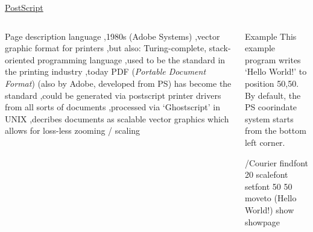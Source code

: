 \begin{frame}[fragile]{\href{https://en.wikipedia.org/wiki/PostScript}{PostScript}} \footnotesize
{}
\begin{columns}
Page description language \sep 1980s (Adobe Systems) \sep vector graphic format for printers \sep but also: Turing-complete, stack-oriented  programming language \sep used to be the standard in the printing industry \sep today PDF (\emph{Portable Document Format}) (also by Adobe, developed from PS) has become the standard \sep could be generated via postscript printer drivers from all sorts of documents \sep processed via  `Ghostscript' in UNIX \sep decribes documents as scalable vector graphics which allows for loss-less zooming / scaling 
~\\[0.2em]

\begin{block}{Example}
This example program writes `Hello World!' to position 50,50. By default, the PS coorindate system starts from the bottom left corner. 
\begin{postscriptcode}
/Courier findfont    %
20 scalefont         %
setfont              %
50 50 moveto         %
(Hello World!) show  %
showpage             %
\end{postscriptcode}
\end{block}
\end{columns}

\end{frame}


